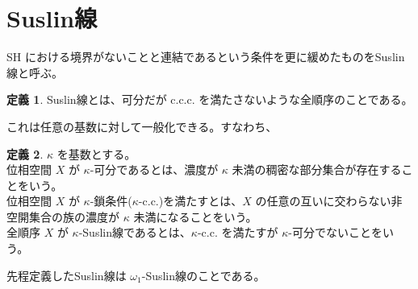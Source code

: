 \documentclass{jsarticle}
\theoremstyle{definition}
\newtheorem*{definition*}{定義}
\begin{document}
    \newpage
    \section{Suslin線}
    SH における境界がないことと連結であるという条件を更に緩めたものをSuslin線と呼ぶ。
    
    \begin{definition*}
        Suslin線とは、可分だが c.c.c. を満たさないような全順序のことである。
    \end{definition*}
    
    これは任意の基数に対して一般化できる。すなわち、

    \begin{definition*}
        $\kappa$ を基数とする。\\
        位相空間 $X$ が $\kappa$-可分であるとは、濃度が $\kappa$ 未満の稠密な部分集合が存在することをいう。\\
        位相空間 $X$ が $\kappa$-鎖条件($\kappa$-c.c.)を満たすとは、$X$ の任意の互いに交わらない非空開集合の族の濃度が $\kappa$ 未満になることをいう。\\
        全順序 $X$ が $\kappa$-Suslin線であるとは、$\kappa$-c.c. を満たすが $\kappa$-可分でないことをいう。
    \end{definition*}
    
    先程定義したSuslin線は $\omega_1$-Suslin線のことである。
    
\end{document}
